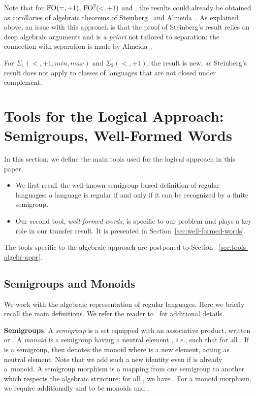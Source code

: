 \documentclass[a4paper,USenglish]{lipics}
\newcommand{\plus}{\ensuremath{+1,min,max}}
\newcommand{\sip}[1]{\ensuremath{\Sigma_{#1}(<,\plus)}\xspace}
\newcommand{\sdp}{\ensuremath{\Sigma_{2}(<,+1)}\xspace}
\newcommand{\foeqp}{\ensuremath{\textup{FO}(=,+1)}\xspace}
\newcommand{\fodp}{\ensuremath{\textup{FO}^2(<,+1)}\xspace}
\newcommand\highlight[1]{\par\bigskip\noindent\textbf{\sffamily #1}.}
\theoremstyle{plain}
\begin{document}
Note that for \foeqp, \fodp and , the results could already be
obtained as corollaries of algebraic theorems of
Steinberg~\cite{Steinberg:delay-pointlikes:2001} and
Almeida~\cite{MR1709911}. As explained above, an issue with this approach is
that the proof of Steinberg's result relies on deep algebraic arguments and is
\emph{a priori} not tailored to separation: the connection with separation is
made by Almeida~\cite{MR1709911}.

For {\sip 1} and \sdp, the result is new, as Steinberg's result does not apply
to classes of languages that are not closed under complement. 

\section{Tools for the Logical Approach: Semigroups, Well-Formed Words}
\label{sec:wfwords}
In this section, we define the main tools used for the logical approach in
this paper. 
\begin{itemize}
\item We first recall the well-known semigroup based definition of regular
  languages: a language is regular if and only if it can be recognized by a
  finite semigroup. 

\item Our second tool, \emph{well-formed words}, is specific to our problem and
  plays a key role in our transfer result. It is presented in Section~\ref{sec:well-formed-words}.
\end{itemize}
The tools specific to the algebraic approach are postponed to Section~
\ref{sec:tools-algebr-appr}.

\subsection{Semigroups and Monoids}
\label{sec:semigroups-morphisms}

We work with the algebraic representation of regular languages. Here we
briefly recall the main definitions. We refer the reader to~\cite{Pin15:MPRI}
for additional details.

\highlight{Semigroups}
A \emph{semigroup} is a set  equipped
with an associative product, written  or . A \emph{monoid} is a
semigroup  having a neutral element , \emph{i.e.}, such that
 for all . If  is a semigroup,
then  denotes the monoid  where  is a new
element, acting as neutral element. Note that we add such a new identity even
if  is already a~monoid. A semigroup morphism is a mapping 
from one semigroup to another which respects the algebraic structure: for all
, we have .
For a monoid morphism, we require additionally  and  to be monoids and .
\end{document}
